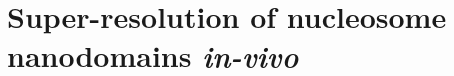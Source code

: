 \documentclass{beamer}					%
\begin{document}

\section{Super-resolution of nucleosome nanodomains \textit{in-vivo}}
\end{document}
